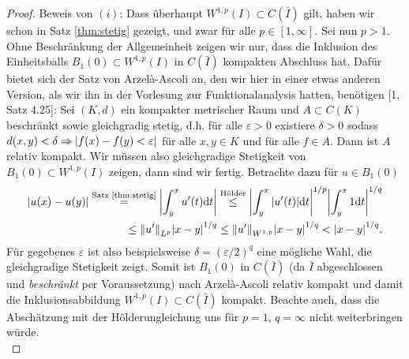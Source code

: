 \documentclass[twoside]{article}
\theoremstyle{definition}
\begin{document}
\begin{proof}
Beweis von $(i)$: Dass überhaupt $W^{1,p}(I) \subset C(\bar{I})$ gilt, haben wir schon in Satz \ref{thm:stetig} gezeigt, und zwar für alle $p \in [1,\infty]$. Sei nun $p>1$. Ohne Beschränkung der Allgemeinheit zeigen wir nur, dass die Inklusion des Einheitsballs $B_1(0) \subset W^{1,p}(I)$ in $C(\bar{I})$ kompakten Abschluss hat. Dafür bietet sich der Satz von Arzel{\`a}-Ascoli an, den wir hier in einer etwas anderen Version, als wir ihn in der Vorlesung zur Funktionalanalysis hatten, benötigen [1, Satz 4.25]: Sei $(K,d)$ ein kompakter metrischer Raum und $A\subset C(K)$ beschränkt sowie gleichgradig stetig, d.h. für alle $\varepsilon > 0$ existiere $\delta > 0$ sodass $d(x,y)< \delta \Rightarrow \abs{f(x)-f(y) < \varepsilon}$ für alle $x,y \in K$ und für alle $f \in A$. Dann ist $A$ relativ kompakt. Wir müssen also gleichgradige Stetigkeit von $B_1(0) \subset W^{1,p}(I)$ zeigen, dann sind wir fertig. Betrachte dazu für $u \in B_1(0)$
\begin{align*}
\abs{u(x)-u(y)} \overset{\text{Satz \ref{thm:stetig}}}{=} \abs{\int_{y}^x u'(t) \mathrm{d}t} \overset{\text{Hölder}}{\leq} \abs{\int_y^x \abs{u'(t)} \mathrm{d}t}^{1/p}\abs{\int_y^x 1 \mathrm{d}t}^{1/q} \\
\leq \norm{u'}_{L^p} \abs{x-y}^{1/q} \leq \norm{u'}_{W^{1,p}} \abs{x-y}^{1/q} <  \abs{x-y}^{1/q}.
\end{align*}
Für gegebenes $\varepsilon$ ist also beispielsweise $\delta = (\varepsilon/2)^q$ eine mögliche Wahl, die gleichgradige Stetigkeit zeigt. Somit ist $B_1(0)$ in $C(\bar{I})$ (da $\bar{I}$ abgeschlossen und \textit{beschränkt} per Voraussetzung) nach Arzel{\`a}-Ascoli relativ kompakt und damit die Inklusionsabbildung $W^{1,p}(I) \subset C(\bar{I})$ kompakt. Beachte auch, dass die Abschätzung mit der Hölderungleichung uns für $p = 1$, $q = \infty$ nicht weiterbringen würde.\\


\end{proof}
\end{document}
